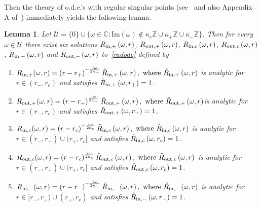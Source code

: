 \documentclass[A4,10pt]{article}
\newtheorem{lemma}{Lemma}[subsection]
\begin{document}
Then the theory of o.d.e.'s with regular singular points (see~\cite{olver} and also Appendix A of~\cite{yakovinsta}) immediately yields the following lemma.

\begin{lemma}\label{odesworkwell}Let $\mathcal{U} = \{0\} \cup \{\omega \in \mathbb{C}: \text{Im}\left(\omega\right) \not\in \kappa_c\mathbb{Z} \cup \kappa_+\mathbb{Z}\cup \kappa_-\mathbb{Z} \}$. Then for every $\omega \in \mathcal{U}$ there exist six solutions $R_{{\rm in},+}\left(\omega,r\right)$, $R_{{\rm out},+}\left(\omega,r\right)$, $R_{{\rm in},c}\left(\omega,r\right)$, $R_{{\rm out},c}\left(\omega,r\right)$, $R_{{\rm in},-}\left(\omega,r\right)$ and $R_{{\rm out},-}\left(\omega,r\right)$ to~\eqref{radode} defined by
\begin{enumerate}
	\item $R_{{\rm in},+}(\omega,r) = \left(r-r_+\right)^{-\frac{i\omega}{2\kappa_+}}\hat{R}_{{\rm in},+}\left(\omega,r\right), \text{ where }\hat{R}_{{\rm in},+}\left(\omega,r\right)$ is analytic for $r \in (r_-,r_c)$  and satisfies $\hat{R}_{{\rm in},+}\left(\omega,r_+\right) = 1$.
	\item $R_{{\rm out},+}(\omega,r) = \left(r-r_+\right)^{\frac{i\omega}{2\kappa_+}}\hat{R}_{{\rm out},+}\left(\omega,r\right), \text{ where }\hat{R}_{{\rm out},+}\left(\omega,r\right)$is analytic for $r \in (r_-,r_c)$  and satisfies $\hat{R}_{{\rm out},+}\left(\omega,r_+\right) = 1$.

	\item $R_{{\rm in},c}(\omega,r) = \left(r-r_c\right)^{-\frac{i\omega}{2\kappa_c}}\hat{R}_{{\rm in},c}\left(\omega,r\right), \text{ where }\hat{R}_{{\rm in},c}\left(\omega,r\right)$ is analytic for $r \in (r_-,r_+) \cup (r_+,r_c]$  and satisfies $\hat{R}_{{\rm in},c}\left(\omega,r_c\right) = 1$.

	\item $R_{{\rm out},c}(\omega,r) = \left(r-r_c\right)^{\frac{i\omega}{2\kappa_c}}\hat{R}_{{\rm out},c}\left(\omega,r\right), \text{ where }\hat{R}_{{\rm out},c}\left(\omega,r\right)$ is analytic for  $r \in (r_-,r_+) \cup (r_+,r_c]$  and satisfies $\hat{R}_{{\rm out},c}\left(\omega,r_c\right) = 1$.

	\item $R_{{\rm in},-}(\omega,r) = \left(r-r_-\right)^{-\frac{i\omega}{2\kappa_-}}\hat{R}_{{\rm in},-}\left(\omega,r\right), \text{ where }\hat{R}_{{\rm in},-}\left(\omega,r\right)$ is analytic for $r \in [r_-,r_+) \cup (r_+,r_c)$  and satisfies $\hat{R}_{{\rm in},-}\left(\omega,r_-\right) = 1$.


\end{enumerate}
\end{lemma}
\end{document}
